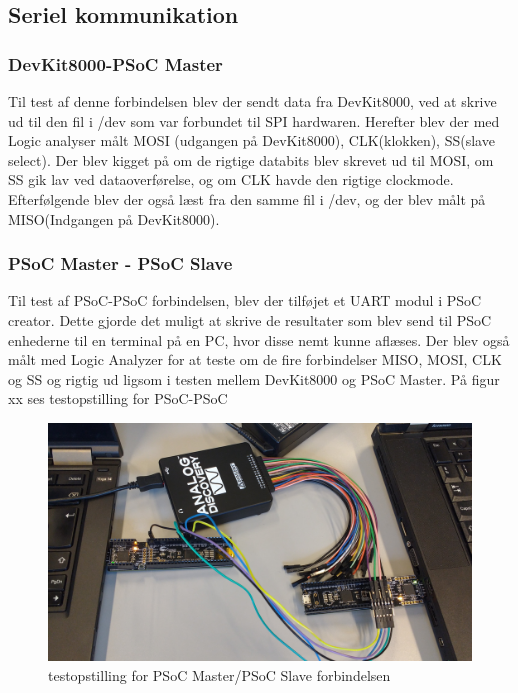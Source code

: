 \subsection{Seriel kommunikation}

\subsubsection{DevKit8000-PSoC Master}
Til test af denne forbindelsen blev der sendt data fra DevKit8000, ved at skrive ud til den fil i /dev som var forbundet til SPI hardwaren. Herefter blev der
med Logic analyser målt MOSI (udgangen på DevKit8000), CLK(klokken), SS(slave select). Der blev kigget på om de rigtige databits blev skrevet ud
til MOSI, om SS gik lav ved dataoverførelse, og om CLK havde den rigtige clockmode. Efterfølgende blev der også læst fra den samme fil i /dev, og der blev målt
på MISO(Indgangen på DevKit8000).

\subsubsection{PSoC Master - PSoC Slave}
Til test af PSoC-PSoC forbindelsen, blev der tilføjet et UART modul i PSoC creator. Dette gjorde det muligt at skrive de resultater som blev send til PSoC 
enhederne til en terminal på en PC, hvor disse nemt kunne aflæses. Der blev også målt med Logic Analyzer for at teste om de fire forbindelser MISO, MOSI, CLK 
og SS og rigtig ud ligsom i testen mellem DevKit8000 og PSoC Master. På figur xx ses testopstilling for PSoC-PSoC\\

\begin{figure}[H]
	\centerline{\includegraphics[scale=0.07]{tex/TeImRe/SPI/SPI_testAnalog}}
	\caption{testopstilling for PSoC Master/PSoC Slave forbindelsen}
\end{figure}